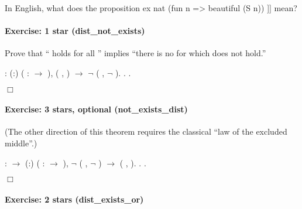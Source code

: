 \documentclass[12pt]{report}
\begin{document}
 In English, what does the proposition 
      ex nat (fun n => beautiful (S n))
]] 
    mean? \begin{coqdoccode}
\coqdocemptyline
\coqdocemptyline
\end{coqdoccode}
\paragraph{Exercise: 1 star (dist\_not\_exists)}

 Prove that `` holds for all '' implies ``there is no  for
    which  does not hold.'' \begin{coqdoccode}
\coqdocemptyline
\coqdocnoindent
{}  : \coqdockw{\ensuremath{\forall}} (:) ( :  \ensuremath{\rightarrow} ),\coqdoceol
\coqdocindent{1.00em}
(\coqdockw{\ensuremath{\forall}} ,  ) \ensuremath{\rightarrow} \ensuremath{\lnot} (\coqdoctac{\ensuremath{\exists}} , \ensuremath{\lnot}  ).\coqdoceol
\coqdocnoindent
{}.\coqdoceol
 .\coqdoceol
\end{coqdoccode}
\ensuremath{\Box} 

\paragraph{Exercise: 3 stars, optional (not\_exists\_dist)}

 (The other direction of this theorem requires the classical ``law
    of the excluded middle''.) \begin{coqdoccode}
\coqdocemptyline
\coqdocnoindent
{}  :\coqdoceol
\coqdocindent{1.00em}
 \ensuremath{\rightarrow}\coqdoceol
\coqdocindent{1.00em}
\coqdockw{\ensuremath{\forall}} (:) ( :  \ensuremath{\rightarrow} ),\coqdoceol
\coqdocindent{2.00em}
\ensuremath{\lnot} (\coqdoctac{\ensuremath{\exists}} , \ensuremath{\lnot}  ) \ensuremath{\rightarrow} (\coqdockw{\ensuremath{\forall}} ,  ).\coqdoceol
\coqdocnoindent
{}.\coqdoceol
 .\coqdoceol
\end{coqdoccode}
\ensuremath{\Box} 

\paragraph{Exercise: 2 stars (dist\_exists\_or)}
\end{document}
